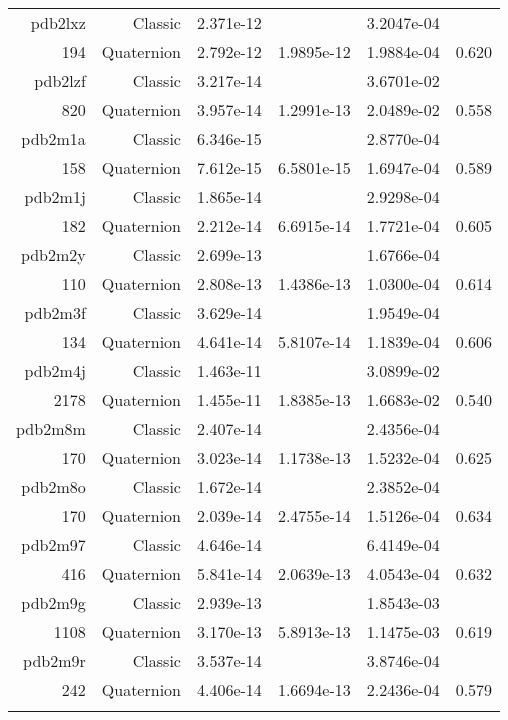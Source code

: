 \begin{xltabular}{\textwidth}{r|rS[table-format=1.3e+2]S[table-format=1.4e+2]S[table-format=1.4e+2]S[table-format=-1.3]}
pdb2lxz & Classic & 2.371e-12 &  & 3.2047e-04 & \\
194 & Quaternion & 2.792e-12 & 1.9895e-12 & 1.9884e-04 & 0.620\\  \addlinespace
{\color{red} pdb2lzf } & Classic & 3.217e-14 &  & 3.6701e-02 & \\
820 & Quaternion & 3.957e-14 & 1.2991e-13 & 2.0489e-02 & 0.558\\  \addlinespace
pdb2m1a & Classic & 6.346e-15 &  & 2.8770e-04 & \\
158 & Quaternion & 7.612e-15 & 6.5801e-15 & 1.6947e-04 & 0.589\\  \addlinespace
pdb2m1j & Classic & 1.865e-14 &  & 2.9298e-04 & \\
182 & Quaternion & 2.212e-14 & 6.6915e-14 & 1.7721e-04 & 0.605\\  \addlinespace
pdb2m2y & Classic & 2.699e-13 &  & 1.6766e-04 & \\
110 & Quaternion & 2.808e-13 & 1.4386e-13 & 1.0300e-04 & 0.614\\  \addlinespace
pdb2m3f & Classic & 3.629e-14 &  & 1.9549e-04 & \\
134 & Quaternion & 4.641e-14 & 5.8107e-14 & 1.1839e-04 & 0.606\\  \addlinespace
{\color{red} pdb2m4j } & Classic & 1.463e-11 &  & 3.0899e-02 & \\
2178 & Quaternion & 1.455e-11 & 1.8385e-13 & 1.6683e-02 & 0.540\\  \addlinespace
pdb2m8m & Classic & 2.407e-14 &  & 2.4356e-04 & \\
170 & Quaternion & 3.023e-14 & 1.1738e-13 & 1.5232e-04 & 0.625\\  \addlinespace
pdb2m8o & Classic & 1.672e-14 &  & 2.3852e-04 & \\
170 & Quaternion & 2.039e-14 & 2.4755e-14 & 1.5126e-04 & 0.634\\  \addlinespace
pdb2m97 & Classic & 4.646e-14 &  & 6.4149e-04 & \\
416 & Quaternion & 5.841e-14 & 2.0639e-13 & 4.0543e-04 & 0.632\\  \addlinespace
pdb2m9g & Classic & 2.939e-13 &  & 1.8543e-03 & \\
1108 & Quaternion & 3.170e-13 & 5.8913e-13 & 1.1475e-03 & 0.619\\  \addlinespace
pdb2m9r & Classic & 3.537e-14 &  & 3.8746e-04 & \\
242 & Quaternion & 4.406e-14 & 1.6694e-13 & 2.2436e-04 & 0.579\\  \addlinespace

\end{xltabular}
